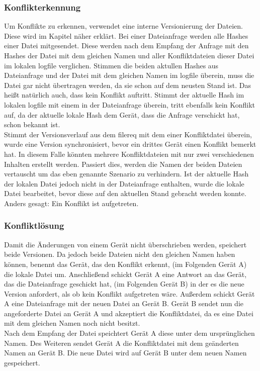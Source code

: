 \subsubsection{Konflikterkennung}\label{Konflikterkennung}
Um Konflikte zu erkennen, verwendet \sblit eine interne Versionierung der Dateien. Diese wird im Kapitel  näher erklärt. Bei einer Dateianfrage  werden alle Hashes einer Datei mitgesendet. Diese werden nach dem Empfang der Anfrage mit den Hashes der Datei mit dem gleichen Namen und aller Konfliktdateien dieser Datei im lokalen \gls{logfile} verglichen. Stimmen die beiden aktullen Hashes aus Dateianfrage und der Datei mit dem gleichen Namen im \gls{logfile} überein, muss die Datei gar nicht übertragen werden, da sie schon auf dem neusten Stand ist. Das heißt natürlich auch, dass kein Konflikt auftritt. Stimmt der aktuelle Hash im lokalen \gls{logfile} mit einem in der Dateianfrage überein, tritt ebenfalls kein Konflikt auf, da der aktuelle lokale Hash dem Gerät, dass die Anfrage verschickt hat, schon bekannt ist. \\
Stimmt der Versionsverlauf aus dem \gls{filereq} mit dem einer Konfliktdatei überein, wurde eine Version synchronisiert, bevor ein drittes Gerät einen Konflikt bemerkt hat. In diesem Falle könnten mehrere Konfliktdateien mit nur zwei verschiedenen Inhalten erstellt werden. Passiert dies, werden die Namen der beiden Dateien vertauscht um das eben genannte Szenario zu verhindern.
Ist der aktuelle Hash der lokalen Datei jedoch nicht in der Dateianfrage enthalten, wurde die lokale Datei bearbeitet, bevor diese auf den aktuellen Stand gebracht werden konnte. Anders gesagt: Ein Konflikt ist aufgetreten.

\subsubsection{Konfliktlösung}
Damit die Änderungen von einem Gerät nicht überschrieben werden, speichert \sblit beide Versionen. Da jedoch beide Dateien nicht den gleichen Namen haben können, benennt das Gerät, das den Konflikt erkennt, (im Folgenden Gerät A) die lokale Datei um. Anschließend schickt Gerät A eine Antwort an das Gerät, das die Dateianfrage geschickt hat,  (im Folgenden Gerät B) in der es die neue Version anfordert, als ob kein Konflikt aufgetreten wäre. Außerdem schickt Gerät A eine Dateianfrage mit der neuen Datei an Gerät B. Gerät B sendet nun die angeforderte Datei an Gerät A und akzeptiert die Konfliktdatei, da es eine Datei mit dem gleichen Namen noch nicht besitzt. \\
Nach dem Empfang der Datei speichtert Gerät A diese unter dem ursprünglichen Namen. Des Weiteren sendet Gerät A die Konfliktdatei mit dem geänderten Namen an Gerät B. Die neue Datei wird auf Gerät B unter dem neuen Namen gespeichert.

